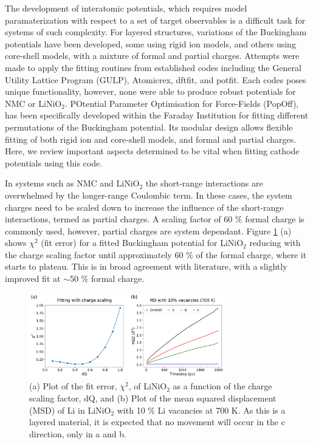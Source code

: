\documentclass[aps,prb,twocolumn,superscriptaddress,reprint]{revtex4-1}
\begin{document}
The development of interatomic potentials, which requires model paramaterization with respect to a set of target observables is a difficult task for systems of such complexity.  
For layered structures, variations of the Buckingham potentials have been developed, some using rigid ion models,\cite{Lewis_1985, Ledwaba2020, Sayle2005, Dawson2014} and others using core-shell models, \cite{Hart1998, Fisher2010, Lewis_1985,Ammundsen1999, Kerisit2014, He2019,lee2012atomistic} with a mixture of formal and partial charges.
Attempts were made to apply the fitting routines from established codes including the General Utility Lattice Program (GULP), \cite{gale_gulp_1997} Atomicrex, \cite{Stukowski_2017} dftfit, \cite{dftfit} and potfit. \cite{wen_kim-compliant_2017} 
Each codes poses unique functionality, however, none were able to produce robust potentials for NMC or LiNiO$_2$.
POtential Parameter Optimisation for Force-Fields (PopOff),\cite{Morgan2020PopOff} has been specifically developed within the Faraday Institution for fitting different permutations of the Buckingham potential. Its modular design allows flexible fitting of both rigid ion and core-shell models, and formal and partial charges. Here, we review important aspects determined to be vital when fitting cathode potentials using this code.

In systems such as NMC and LiNiO$_2$ the short-range interactions are overwhelmed by the longer-range Coulombic term. 
In these cases, the system charges need to be scaled down to increase the influence of the short-range interactions, termed as partial charges. 
A scaling factor of 60 \% formal charge is commonly used, \cite{pedone2006potentials} however, partial charges are system dependant. 
Figure \ref{fig:LiNiO2_fitting} (a) shows $\chi^2$ (fit error) for a fitted Buckingham potential for LiNiO$_2$ reducing with the charge scaling factor until approximately 60 \% of the formal charge, where it starts to plateau.
This is in broad agreement with literature, with a slightly improved fit at $\sim$50 \% formal charge.

\begin{figure}[h]
    \centering
    \includegraphics[width=8.5cm]{Figures/LiNiO2_plots.pdf}
    \caption{\label{fig:LiNiO2_fitting} (a) Plot of the fit error, $\chi^2$, of LiNiO$_2$ as a function of the charge scaling factor, dQ, and (b) Plot of the mean squared displacement (MSD) of Li in LiNiO$_2$ with 10 \% Li vacancies at 700 K. As this is a layered material, it is expected that no movement will occur in the c direction, only in a and b.}
\end{figure}
\end{document}
